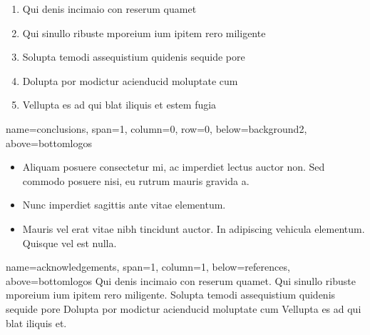 \documentclass[a0paper,portrait]{baposter}
\newcommand{\acknowledgementsfont}{\small}
\begin{document}
\begin{poster}
{\begin{enumerate}
\item Qui denis incimaio con reserum quamet
\item Qui sinullo ribuste mporeium ium ipitem rero miligente
\item Solupta temodi assequistium quidenis sequide pore
\item Dolupta por modictur acienducid moluptate cum
\item Vellupta es ad qui blat iliquis et estem fugia
\end{enumerate}
\vspace{1mm}
}





{name=conclusions, span=1, column=0, row=0, below=background2, above=bottomlogos}{
\vspace{0.5mm}

\begin{itemize}
\item Aliquam posuere consectetur mi, ac imperdiet lectus auctor non.
Sed commodo posuere nisi, eu rutrum mauris gravida a.
\item Nunc imperdiet sagittis ante vitae elementum.
\item Mauris vel erat vitae nibh tincidunt auctor. In adipiscing vehicula
elementum. Quisque vel est nulla.
\end{itemize}
}

{name=acknowledgements, span=1, column=1, below=references, above=bottomlogos}{
\acknowledgementsfont
Qui denis incimaio con reserum quamet. Qui sinullo ribuste mporeium ium ipitem rero miligente. Solupta temodi assequistium quidenis sequide pore Dolupta por modictur acienducid moluptate cum Vellupta es ad qui blat iliquis et.
}

\end{poster}
\end{document}
